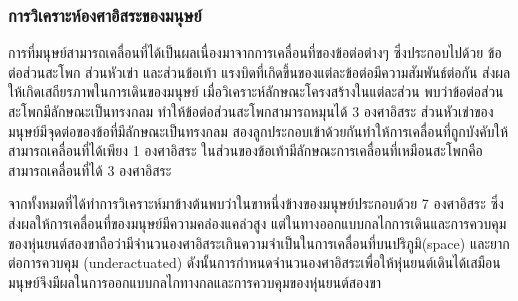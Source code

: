 \clearpage
\subsubsection{การวิเคราะห์องศาอิสระของมนุษย์}
การที่มนุษย์สามารถเคลื่อนที่ได้เป็นผลเนื่องมาจากการเคลื่อนที่ของข้อต่อต่างๆ ซึ่งประกอบไปด้วย ข้อต่อส่วนสะโพก ส่วนหัวเข่า และส่วนข้อเท้า
แรงบิดที่เกิดขึ้นของแต่ละข้อต่อมีความสัมพันธ์ต่อกัน ส่งผลให้เกิดเสถียรภาพในการเดินของมนุษย์
เมื่อวิเคราะห์ลักษณะโครงสร้างในแต่ละส่วน พบว่าข้อต่อส่วนสะโพกมีลักษณะเป็นทรงกลม 
ทำให้ข้อต่อส่วนสะโพกสามารถหมุนได้ 3 องศาอิสระ ส่วนหัวเข่าของมนุษย์มีจุดต่อของข้อที่มีลักษณะเป็นทรงกลม
สองลูกประกอบเข้าด้วยกันทำให้การเคลื่อนที่ถูกบังคับให้สามารถเคลื่อนที่ได้เพียง 1 องศาอิสระ
ในส่วนของข้อเท้ามีลักษณะการเคลื่อนที่เหมือนสะโพกคือสามารถเคลื่อนที่ได้ 3 องศาอิสระ

จากทั้งหมดที่ได้ทำการวิเคราะห์มาข้างต้นพบว่าในขาหนึ่งข้างของมนุษย์ประกอบด้วย 7 องศาอิสระ
ซึ่งส่งผลให้การเคลื่อนที่ของมนุษย์มีความคล่องแคล่วสูง แต่ในทางออกแบบกลไกการเดินและการควบคุม
ของหุ่นยนต์สองขาถือว่ามีจำนวนองศาอิสระเกินความจำเป็นในการเคลื่อนที่บนปริภูมิ(space) และยากต่อการควบคุม
(underactuated) ดังนั้นการกำหนดจำนวนองศาอิสระเพื่อให้หุ่นยนต์เดินได้เสมือนมนุษย์จึงมีผลในการออกแบบกลไกทางกลและการควบคุมของหุ่นยนต์สองขา 

